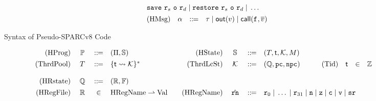 \begin{figure*}[!t]
\[\begin{array}{rcclcrccl}
            \multicolumn{6}{l}
            {
                \csave{} \ \reg{s} \ \oexp \ \reg{d} \sepline 
                \crestore{} \ \reg{s} \ \oexp \ \reg{d} \sepline
                \dots
            } 
            \\
            \\[-8pt]
            \TYPE{(HMsg)} & \hmsg & \define & \empmsg \sepline \outEvt{\val} \sepline 
            \callEvt{\lab{}, \args{\val}} 
        \end{array}
    \]
    \vspace{-1em}
    \caption{Syntax of Pseudo-SPARCv8 Code}
    \label{fig:syntax-of-concur-pseudo-sparc}
    \vspace{-1em}
\end{figure*}
\begin{figure*}[!t]
    \centering
    \small
    \[
        \begin{array}{rcclrcclrccl}
            \TYPE{(HProg)} & \ \HProg \ & \define & 
            (\HMd, \hpstate) &
            \TYPE{(HState)} & \hpstate & \define & 
            \multicolumn{3}{l}
            {
                (\thrdpool, \thrdid, \hthrdlocalst, \Mem)
            }
            \\
            \\[-8pt]
            \TYPE{(ThrdPool)} & \thrdpool & \define & 
            \{ \thrdid \rightsquigarrow \hthrdlocalst \}^{*}
            & \ \ 
            \TYPE{(ThrdLcSt)} & \ \hthrdlocalst \ & \define & 
            (\hRstate, \pc, \npc) 
            & \qquad
            \TYPE{(Tid)} & \thrdid & \in & \Ztype \\
            \\
            \TYPE{(HRstate)} & \hRstate & \define & 
            (\hRfile, \hWstk) \\
            \\[-8pt]
            \TYPE{(HRegFile)} & \hRfile & \in & 
            \TYPE{HRegName} \rightharpoonup \TYPE{Val} 
            & \quad
            \TYPE{(HRegName)} & \hrn & \define & 
            \multicolumn{5}{l}
            {
                \reg{0} \sepline \dots \sepline \reg{31} \sepline 
                \regn \sepline \regz \sepline \regc \sepline \regv 
                \sepline \sr
            } \\
            \\[-8pt]

\end{array}\]
\end{figure*}
